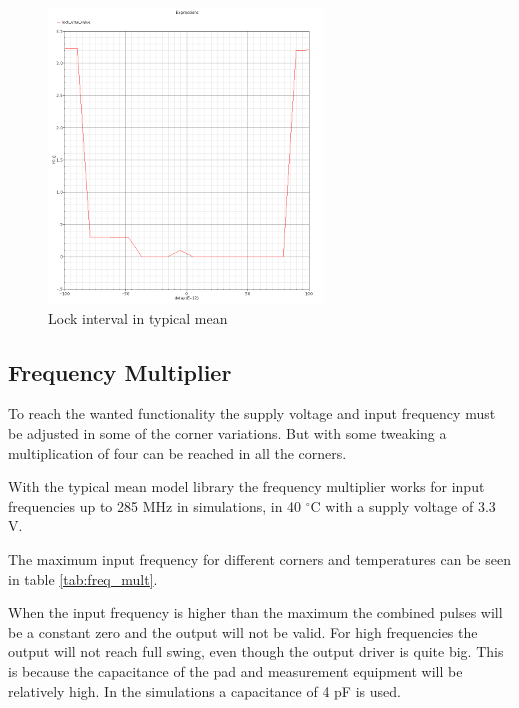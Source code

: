 \documentclass[a4paper,12pt]{article} \usepackage{graphicx}
\newcommand{\degree}{\ensuremath{^\circ}}
\begin{document}
\begin{figure}[h]
  \centering
  \includegraphics[width=0.65\textwidth]{../Bilder/LD_tran/LD_lsim_tm.png}
  \caption{Lock interval in typical mean}
  \label{fig:LDtm}
\end{figure}

\clearpage

\subsection{Frequency Multiplier}
To reach the wanted functionality the supply voltage and input frequency must be
adjusted in some of the corner variations. But with some tweaking a
multiplication of four can be reached in all the corners.

With the typical mean model library the frequency multiplier works for
input frequencies up to 285 MHz in simulations, in 40 \degree C with a supply
voltage of 3.3 V.

The maximum input frequency for different corners and temperatures can be seen
in table \ref{tab:freq_mult}.

When the input frequency is higher than the maximum the combined pulses will be
a constant zero and the output will not be valid. For high frequencies the
output will not reach full swing, even though the output driver is quite big.
This is because the capacitance of the pad and measurement equipment will be
relatively high. In the simulations a capacitance of 4 pF is used.
\end{document}
